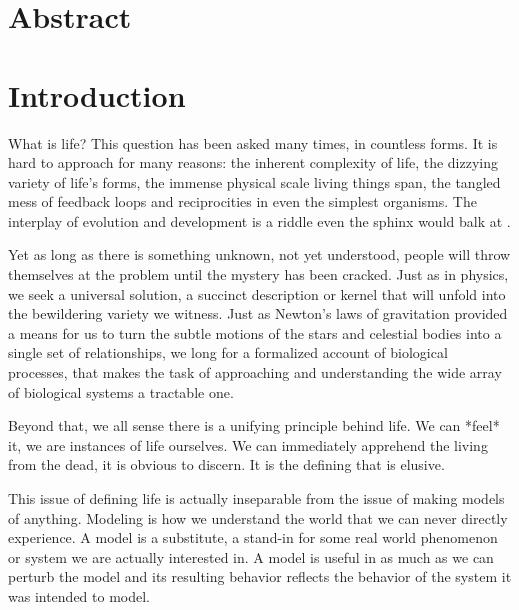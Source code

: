 \documentclass[12pt]{article}
\begin{document}
\maketitle

\section{Abstract}



\section{Introduction}

What is life?  This question has been asked many times, in countless forms.  It is hard to approach for many reasons: the inherent complexity of life, the dizzying variety of life's forms, the immense physical scale living things span, the tangled mess of feedback loops and reciprocities in even the simplest organisms.  The interplay of evolution and development is a riddle even the sphinx would balk at \cite{Oyama}.  

Yet as long as there is something unknown, not yet understood, people will throw themselves at the problem until the mystery has been cracked.  Just as in physics, we seek a universal solution, a succinct description or kernel that will unfold into the bewildering variety we witness.  Just as Newton's laws of gravitation provided a means for us to turn the subtle motions of the stars and celestial bodies into a single set of relationships, we long for a formalized account of biological processes, that makes the task of approaching and understanding the wide array of biological systems a tractable one.  

Beyond that, we all sense there is a unifying principle behind life.  We can *feel* it, we are instances of life ourselves.  We can immediately apprehend the living from the dead, it is obvious to discern.  It is the defining that is elusive.  

This issue of defining life is actually inseparable from the issue of making models of anything.  Modeling is how we understand the world that we can never directly experience.  A model is a substitute, a stand-in for some real world phenomenon or system we are actually interested in.  A model is useful in as much as we can perturb the model and its resulting behavior reflects the behavior of the system it was intended to model.  
\end{document}
